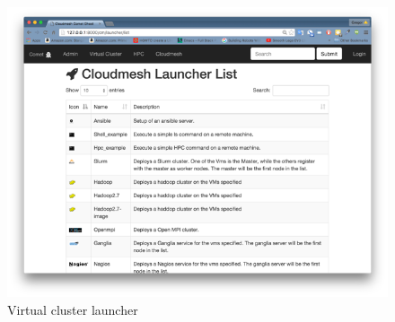 \begin{figure}[htb] 
  \centering 
    \includegraphics[width=1.0\columnwidth]{images/client/Picture7.png} 
    \caption{Virtual cluster launcher}
    \label{F:7}
\end{figure} 



